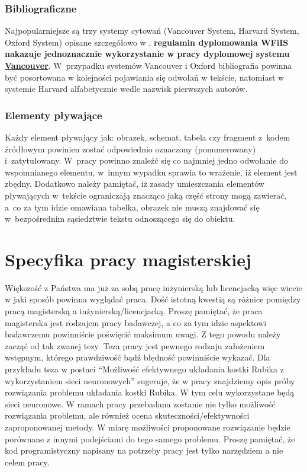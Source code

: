 \documentclass[12pt,a4paper]{article}
\begin{document}
\subsubsection{Bibliograficzne}
Najpopularniejsze są trzy systemy cytowań (Vancouver System, Harvard System, Oxford System) opisane szczegółowo w \cite{Cytowanie}, {\bf regulamin dyplomowania WFiIS nakazuje jednoznacznie  wykorzystanie w pracy dyplomowej systemu \underline{Vancouver}}. W~przypadku systemów Vancouver i Oxford bibliografia powinna być posortowana w kolejności pojawiania się odwołań w tekście, natomiast w systemie Harvard alfabetycznie wedle nazwisk pierwszych autorów.

\subsubsection{Elementy pływające}
Każdy element pływający jak: obrazek, schemat, tabela czy fragment z~kodem źródłowym powinien zostać odpowiednio oznaczony (ponumerowany) i~zatytułowany. W~pracy powinno znaleźć się co najmniej jedno odwołanie do wspomnianego elementu, w~innym wypadku sprawia to wrażenie, iż element jest zbędny. Dodatkowo należy pamiętać, iż zasady umieszczania elementów pływających w~tekście ograniczają znacząco jaką część strony mogą zawierać, a~co za tym idzie omawiana tabelka, obrazek nie muszą znajdować się w~bezpośrednim sąsiedztwie tekstu odnoszącego się do obiektu.

\section{Specyfika pracy magisterskiej}
Większość z Państwa ma już za sobą pracę inżynierską lub licencjacką więc wiecie w jaki sposób powinna wyglądać praca. Dość istotną kwestią są różnice pomiędzy pracą magisterską a inżynierską/licencjacką. Proszę pamiętać, że praca magisterska jest rodzajem pracy badawczej, a co za tym idzie aspektowi badawczemu powinniście poświęcić maksimum uwagi. Z tego powodu należy zacząć od tak zwanej tezy. Teza pracy jest pewnego rodzaju założeniem wstępnym, którego prawdziwość bądź błędność powinniście wykazać. Dla przykładu teza w postaci ``Możliwość efektywnego układania kostki Rubika z wykorzystaniem sieci neuronowych'' sugeruje, że w pracy znajdziemy opis próby rozwiązania problemu układania kostki Rubika. W tym celu wykorzystane będą sieci neuronowe. W ramach pracy przebadana zostanie nie tylko możliwość rozwiązania problemu, ale również ocena skuteczności/efektywności zaproponowanej metody. W miarę możliwości proponowane rozwiązanie będzie porównane z innymi podejściami do tego samego problemu. Proszę pamiętać, że kod programistyczny napisany na potrzeby pracy jest tylko narzędziem a nie celem pracy.
\end{document}

